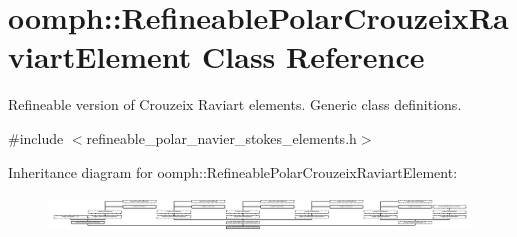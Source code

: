 \hypertarget{classoomph_1_1RefineablePolarCrouzeixRaviartElement}{}\section{oomph\+:\+:Refineable\+Polar\+Crouzeix\+Raviart\+Element Class Reference}
\label{classoomph_1_1RefineablePolarCrouzeixRaviartElement}


Refineable version of Crouzeix Raviart elements. Generic class definitions.  




{\ttfamily \#include $<$refineable\+\_\+polar\+\_\+navier\+\_\+stokes\+\_\+elements.\+h$>$}

Inheritance diagram for oomph\+:\+:Refineable\+Polar\+Crouzeix\+Raviart\+Element\+:\begin{figure}[H]
\begin{center}
\leavevmode
\includegraphics[height=0.975610cm]{classoomph_1_1RefineablePolarCrouzeixRaviartElement}
\end{center}
\end{figure}
